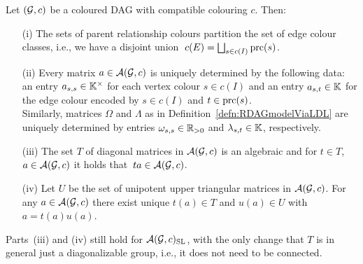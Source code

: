 \begin{lemma}\label{lem:PropertiesCompatibleColouring}
	Let $(\mathcal{G}, c)$ be a coloured DAG with compatible colouring $c$. Then:
	\begin{itemize}
		\item[(i)] The sets of parent relationship colours partition the set of edge colour classes, i.e., we have a disjoint union $\; c(E) = \bigsqcup_{s \in c(I)} \operatorname{prc}(s)$. %
		
		\item[(ii)] Every matrix $a \in \mathcal{A}(\mathcal{G}, c)$ is uniquely determined by the following data: an entry $a_{s,s} \in \mathbb K^{\times}$ for each vertex colour $s \in c(I)$ and an entry $a_{s,t} \in \mathbb K$ for the edge colour encoded by $s \in c(I)$ and $t \in \operatorname{prc}(s)$.\\
		Similarly, matrices $\Omega$ and $\Lambda$ as in Definition~\ref{defn:RDAGmodelViaLDL} are uniquely determined by entries $\omega_{s,s} \in \mathbb R_{>0}$ and $\lambda_{s,t} \in \mathbb K$, respectively.
		
		\item[(iii)] The set $T$ of diagonal matrices in $\mathcal{A}(\mathcal{G}, c)$ is an algebraic and
		for $t \in T$, $a \in \mathcal{A}(\mathcal{G}, c)$ it holds that $\, ta \in \mathcal{A}(\mathcal{G}, c)$.
		
		\item[(iv)] Let $U$ be the set of unipotent upper triangular matrices in $\mathcal{A}(\mathcal{G}, c)$. For any $a \in \mathcal{A}(\mathcal{G}, c)$ there exist unique $t(a) \in T$ and $u(a) \in U$ with $a = t(a) u(a)$.
	\end{itemize}
	Parts~(iii) and (iv) still hold for $\mathcal{A}(\mathcal{G}, c)_{\operatorname{SL}}$, with the only change that $T$ %
	is in general just a diagonalizable group, i.e., it does not need to be connected. %
\end{lemma}


